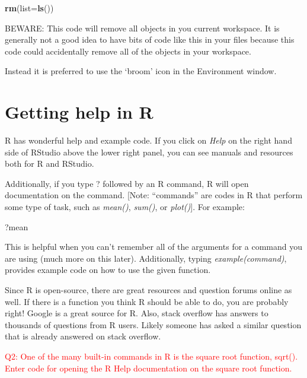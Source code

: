 \documentclass[]{article}
\newenvironment{Shaded}{\begin{snugshade}}{\end{snugshade}}
\newcommand{\DataTypeTok}[1]{\textcolor[rgb]{0.13,0.29,0.53}{#1}}
\newcommand{\KeywordTok}[1]{\textcolor[rgb]{0.13,0.29,0.53}{\textbf{#1}}}
\newcommand{\NormalTok}[1]{#1}
\begin{document}
\begin{Shaded}
\begin{Highlighting}[]
\KeywordTok{rm}\NormalTok{(}\DataTypeTok{list=}\KeywordTok{ls}\NormalTok{())}
\end{Highlighting}
\end{Shaded}

BEWARE: This code will remove all objects in you current workspace. It
is generally not a good idea to have bits of code like this in your
files because this code could accidentally remove all of the objects in
your workspace.

Instead it is preferred to use the `broom' icon in the Environment
window.

\hypertarget{getting-help-in-r}{%
\section{Getting help in R}\label{getting-help-in-r}}

R has wonderful help and example code. If you click on \emph{Help} on
the right hand side of RStudio above the lower right panel, you can see
manuals and resources both for R and RStudio.

Additionally, if you type ? followed by an R command, R will open
documentation on the command. {[}Note: ``commands'' are codes in R that
perform some type of task, such as \emph{mean()}, \emph{sum()}, or
\emph{plot()}{]}. For example:

\begin{Shaded}
\begin{Highlighting}[]
\NormalTok{?mean}
\end{Highlighting}
\end{Shaded}

This is helpful when you can't remember all of the arguments for a
command you are using (much more on this later). Additionally, typing
\emph{example(command)}, provides example code on how to use the given
function.

Since R is open-source, there are great resources and question forums
online as well. If there is a function you think R should be able to do,
you are probably right! Google is a great source for R. Also, stack
overflow has answers to thousands of questions from R users. Likely
someone has asked a similar question that is already answered on stack
overflow.

\textcolor{red}{Q2: One of the many built-in commands in R is the square root function, sqrt(). Enter code for opening the R Help documentation on the square root function.}
\end{document}
